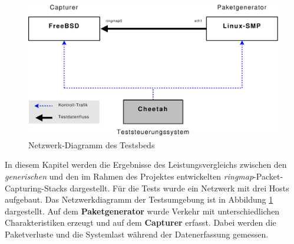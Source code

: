 \begin{figure} 
\centering \includegraphics[width=5.5in]{bilder/Messaufbau}
\caption{Netzwerk-Diagramm des Testsbeds}
\label{img:test_aufbau}
\end{figure}
In diesem Kapitel werden die Ergebnisse des Leistungsvergleichs zwischen den
\emph{generischen} und den im Rahmen des Projektes entwickelten
\emph{ringmap}-Packet-Capturing-Stacks dargestellt. Für die Tests wurde ein
Netzwerk mit drei Hosts aufgebaut. Das Netzwerkdiagramm der Testsumgebung ist
in Abbildung \ref{img:test_aufbau} dargestellt. Auf dem \textbf{Paketgenerator}
wurde Verkehr mit unterschiedlichen Charakteristiken erzeugt und auf dem
\textbf{Capturer} erfasst. Dabei werden die Paketverluste und die
Systemlast während der Datenerfassung gemessen.
%

